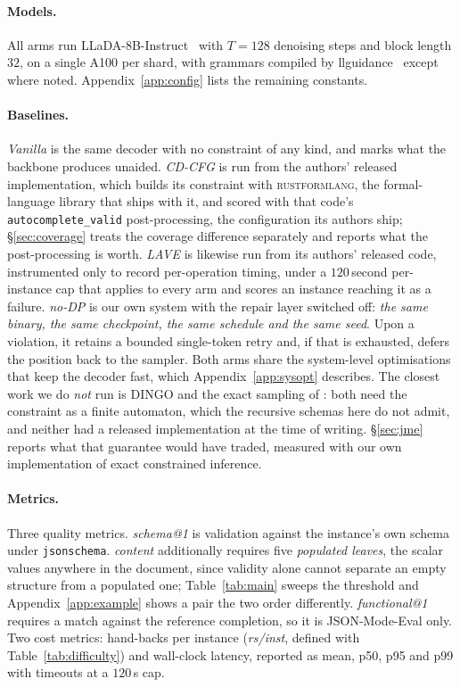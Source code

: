 \documentclass{article}
\begin{document}
\paragraph{Models.}
All arms run LLaDA-8B-Instruct~\citep{llada} with $T{=}128$ denoising steps and
block length $32$, on a single A100 per shard, with grammars compiled by
llguidance~\citep{microsoft2025llguidance} except where noted.
Appendix~\ref{app:config} lists the remaining constants.

\paragraph{Baselines.}
\emph{Vanilla} is the same decoder with no constraint of any kind, and marks
what the backbone produces unaided. \emph{CD-CFG} \citep{cd4dllm} is run from the
authors' released implementation, which builds its constraint with
\textsc{rustformlang}, the formal-language library that ships with it, and scored
with that code's \texttt{autocomplete\_valid} post-processing, the configuration
its authors ship; \S\ref{sec:coverage} treats the coverage difference separately
and reports what the post-processing is worth. \emph{LAVE}
\citep{zhang2026lookaheadthenverifyreliableconstraineddecoding} is likewise run
from its authors' released code, instrumented only to record per-operation
timing, under a $120$\,second per-instance cap that applies to every arm and
scores an instance reaching it as a failure. \emph{no-DP} is our own system with
the repair layer switched off: \emph{the same binary, the same checkpoint, the
same schedule and the same seed}. Upon a violation, it retains a bounded single-token 
retry and, if that is exhausted, defers the position back to the sampler. Both arms share the system-level
optimisations that keep the decoder fast, which Appendix~\ref{app:sysopt}
describes. The closest work we do \emph{not} run is DINGO
\citep{suresh2025dingoconstrainedinferencediffusion} and the exact sampling of
\citet{dang2026fadllm}: both need the constraint as a finite automaton, which the
recursive schemas here do not admit, and neither had a released implementation at
the time of writing. \S\ref{sec:jme} reports what that guarantee would
have traded, measured with our own implementation of exact constrained
inference.

\paragraph{Metrics.}
Three quality metrics. \emph{schema@1} is validation against the instance's own
schema under \texttt{jsonschema}. \emph{content} additionally requires five \emph{populated leaves}, the scalar values anywhere in the document, since
validity alone cannot separate an empty structure from a
populated one; Table~\ref{tab:main} sweeps the threshold and
Appendix~\ref{app:example} shows a pair the two order differently.
\emph{functional@1} requires a match against the reference completion, so it is
JSON-Mode-Eval only. Two cost metrics: hand-backs per instance
(\emph{rs/inst}, defined with Table~\ref{tab:difficulty}) and wall-clock latency,
reported as mean, p50, p95 and p99 with timeouts at a $120$\,s cap.
\end{document}
